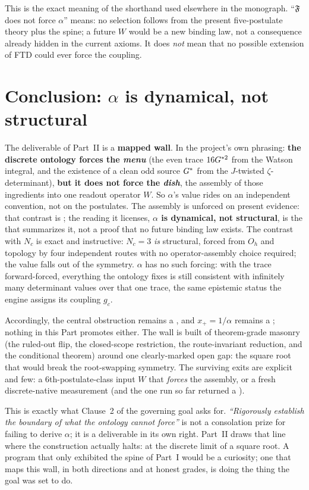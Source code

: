 \medskip
\noindent This is the exact meaning of the shorthand used elsewhere in the
monograph. ``$\mathfrak{F}$ does not force $\alpha$'' means: no selection follows
from the present five-postulate theory plus the spine; a future $W$ would be a
new binding law, not a consequence already hidden in the current axioms. It does
\emph{not} mean that no possible extension of FTD could ever force the coupling.

\section{Conclusion: \texorpdfstring{$\alpha$}{alpha} is dynamical, not structural}\label{sec:dynamical}
The deliverable of Part~II is a \textbf{mapped wall}. In the project's own
phrasing: \textbf{the discrete ontology forces the \emph{menu}} (the even
trace $16G^{*2}$ from the Watson integral, and the existence of a clean odd source
$G^{*}$ from the $J$-twisted $\zeta$-determinant), \textbf{but it does not force
the \emph{dish}}, the assembly of those ingredients into one readout operator $W$.
So $\alpha$'s value rides on an independent convention, not on the postulates.
The assembly is unforced on present evidence: that contrast is ;
the reading it licenses, \textbf{$\alpha$ is dynamical, not structural}, is the
 that summarizes it, not a proof that no future binding law exists. The
contrast with $N_c$ is exact and
instructive: $N_c=3$ \emph{is} structural, forced from $O_h$ and topology by
four independent routes with no operator-assembly choice required; the value falls
out of the symmetry. $\alpha$ has no such forcing: with the trace forward-forced,
everything the ontology fixes is still consistent with infinitely many determinant
values over that one trace, the same epistemic status the engine assigns its coupling
$g_c$.

\medskip
\noindent Accordingly, the central obstruction remains a , and
$x_+=1/\alpha$ remains a ; nothing in this Part promotes either. The
wall is built of theorem-grade masonry (the ruled-out flip, the closed-scope
restriction, the route-invariant reduction, and the conditional theorem) around
one clearly-marked open gap: the square root that would break the root-swapping
symmetry. The surviving exits are explicit and few: a 6th-postulate-class input
$W$ that \emph{forces} the assembly, or a fresh discrete-native measurement (and
the one run so far returned a ).

\medskip
\noindent This is exactly what Clause~2 of the governing goal asks for.
\emph{``Rigorously establish the boundary of what the ontology cannot force''} is
not a consolation prize for failing to derive $\alpha$; it is a deliverable in
its own right. Part~II draws that line where the construction actually halts: at
the discrete limit of a square root. A program that only exhibited the spine of
Part~I would be a curiosity; one that maps this wall, in both directions and at
honest grades, is doing the thing the goal was set to do.

